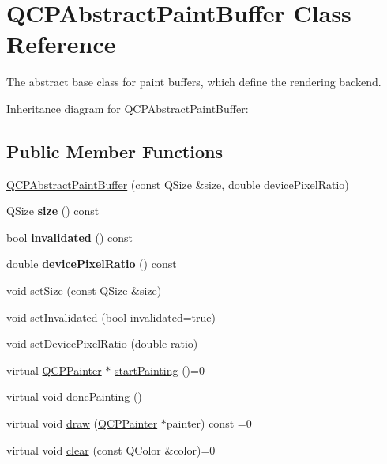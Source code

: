 \hypertarget{classQCPAbstractPaintBuffer}{}\section{Q\+C\+P\+Abstract\+Paint\+Buffer Class Reference}
\label{classQCPAbstractPaintBuffer}


The abstract base class for paint buffers, which define the rendering backend.  




Inheritance diagram for Q\+C\+P\+Abstract\+Paint\+Buffer\+:
\subsection*{Public Member Functions}
\begin{DoxyCompactItemize}
\item 
\hyperlink{classQCPAbstractPaintBuffer_a3ce532c12f10b81697108835755641e2}{Q\+C\+P\+Abstract\+Paint\+Buffer} (const Q\+Size \&size, double device\+Pixel\+Ratio)
\item 
Q\+Size {\bfseries size} () const \hypertarget{classQCPAbstractPaintBuffer_aad79fd72221e4614a771c03985798d9b}{}\label{classQCPAbstractPaintBuffer_aad79fd72221e4614a771c03985798d9b}

\item 
bool {\bfseries invalidated} () const \hypertarget{classQCPAbstractPaintBuffer_a4b8de01a2485c2bf8e98fdbec7f0bcc6}{}\label{classQCPAbstractPaintBuffer_a4b8de01a2485c2bf8e98fdbec7f0bcc6}

\item 
double {\bfseries device\+Pixel\+Ratio} () const \hypertarget{classQCPAbstractPaintBuffer_a107d55bb234b5d19651157071d3b2c37}{}\label{classQCPAbstractPaintBuffer_a107d55bb234b5d19651157071d3b2c37}

\item 
void \hyperlink{classQCPAbstractPaintBuffer_a8b68c3cd36533f1a4a23b5ce8cd66f01}{set\+Size} (const Q\+Size \&size)
\item 
void \hyperlink{classQCPAbstractPaintBuffer_ae4c7dc70dfc66be2879ce297b2b3d67f}{set\+Invalidated} (bool invalidated=true)
\item 
void \hyperlink{classQCPAbstractPaintBuffer_a555eaad5d5c806420ff35602a1bb68fa}{set\+Device\+Pixel\+Ratio} (double ratio)
\item 
virtual \hyperlink{classQCPPainter}{Q\+C\+P\+Painter} $\ast$ \hyperlink{classQCPAbstractPaintBuffer_a9e9f29b19c033cf02fb96f1a148463f3}{start\+Painting} ()=0
\item 
virtual void \hyperlink{classQCPAbstractPaintBuffer_a41b0dc6e7744f19fae09f8532c207dc1}{done\+Painting} ()
\item 
virtual void \hyperlink{classQCPAbstractPaintBuffer_afb998c7525e3ae37d9d2d46c7aaf461a}{draw} (\hyperlink{classQCPPainter}{Q\+C\+P\+Painter} $\ast$painter) const =0
\item 
virtual void \hyperlink{classQCPAbstractPaintBuffer_a9e253f4541dfc01992b77e8830bd7722}{clear} (const Q\+Color \&color)=0
\end{DoxyCompactItemize}
